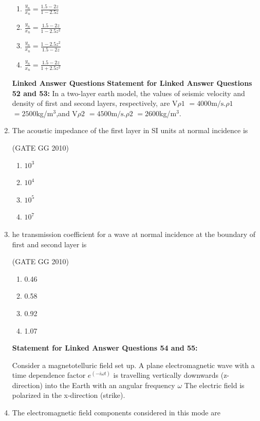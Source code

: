 \documentclass[journal]{IEEEtran}
\begin{document}
\begin{enumerate}[start=26]
\begin{enumerate}
    \item $\frac{y_n}{x_n}=\frac{1.5-2z}{1-2.5z}$
    \vspace{0.3cm}
    \item $\frac{y_n}{x_n}=\frac{1.5-2z}{1-2.5z^2}$
    \vspace{0.3cm}
    \item  $\frac{y_n}{x_n}=\frac{1-2.5z^2}{1.5-2z}$
    \vspace{0.3cm}
    \item $\frac{y_n}{x_n}=\frac{1.5-2z}{1+2.5z^2}$
\end{enumerate}
\vspace{0.3cm}
\textbf{Linked Answer Questions}
\textbf{Statement for Linked Answer Questions 52 and 53:}
In a two-layer earth model, the values of seismic velocity and density of first and second layers, respectively, are V$\rho 1$ $= 4000 \text{m/s}$.$\rho 1$ $=2500$kg/m$^3$,and  V$\rho 2$ $= 4500 \text{m/s}$.$\rho 2$ $=2600$kg/m$^3$.
\item The acoustic impedance of the first layer in SI units at normal incidence is

\hfill{(GATE GG 2010)}

\begin{enumerate}
    \item  $10^3$
\item  $10^4$
\item  $10^5$
\item  $10^7$
\end{enumerate}
\item he transmission coefficient for a wave at normal incidence at the boundary of first and second layer is

\hfill{(GATE GG 2010)}

\begin{enumerate}
    \item  0.46
\item 0.58
\item 0.92
\item  1.07
\end{enumerate}
\textbf{Statement for Linked Answer Questions 54 and 55:}

Consider a magnetotelluric  field set up. A plane electromagnetic wave with a time dependence factor $e^{(-i\omega t)}$ is travelling vertically downwards (z-direction) into the Earth with an angular frequency $\omega$ The electric field is polarized in the x-direction (strike).
\item The electromagnetic field components considered in this mode are


\end{enumerate}
\end{document}
